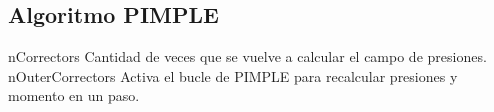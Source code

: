 \subsection{Algoritmo PIMPLE}

nCorrectors Cantidad de veces que se vuelve a calcular el campo de presiones.
nOuterCorrectors Activa el bucle de PIMPLE para recalcular presiones y momento en un paso.

